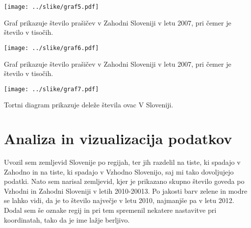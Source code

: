 \documentclass[11pt,a4paper]{article}
\begin{document}
\texttt{[image: ../slike/graf5.pdf]}

Graf prikazuje število prašičev v Zahodni Sloveniji v letu 2007, pri čemer je število v tisočih.

\texttt{[image: ../slike/graf6.pdf]}

Graf prikazuje število prašičev v Zahodni Sloveniji v letu 2007, pri čemer je število v tisočih.

\texttt{[image: ../slike/graf7.pdf]}

Tortni diagram prikazuje deleže števila ovac V Sloveniji.


\newpage
\section{Analiza in vizualizacija podatkov}
Uvozil sem zemljevid Slovenije po regijah, ter jih razdelil na tiste, ki spadajo v Zahodno in na tiste, ki spadajo v Vzhodno Slovenijo, saj mi tako dovoljujejo podatki. Nato sem narisal zemljevid, kjer je prikazano skupno število goveda po Vzhodni in Zahodni Sloveniji v letih 2010-20013. Po jakosti barv zelene in modre se lahko vidi, da je to število največje v letu 2010, najmanjše pa v letu 2012. Dodal sem še oznake regij in pri tem spremenil nekatere nastavitve pri koordinatah, tako da je ime lažje berljivo.
\end{document}
